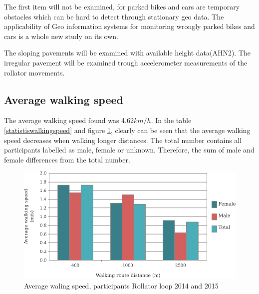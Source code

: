 The first item will not be examined, for parked bikes and cars are temporary obstacles which can be hard to detect through stationary geo data. The applicability of Geo information systems for monitoring wrongly parked bikes and cars is a whole new study on its own.

The sloping pavements will be examined with available height data(AHN2). The irregular pavement will be examined trough accelerometer measurements of the rollator movements. 

\subsection{Average walking speed}
The average walking speed found was 4.62$km/h$. In the table \ref{statistiswalkingspeed} and figure \ref{averagewalkingspeed}, clearly can be seen that the average walking speed decreases when walking longer distances. 
The total number contains all participants labelled as male, female or unknown. Therefore, the sum of male and female differences from the total number.

\begin{figure}[h]
\includegraphics[width=\textwidth]{img/R_averageWalkingSpeed.pdf}
\centering
\caption{Average waling speed, participants Rollator loop 2014 and 2015 \label{averagewalkingspeed}}
\end{figure}


